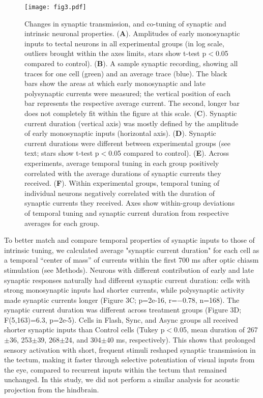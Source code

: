 \documentclass{article}
\begin{document}
\begin{figure*}[!t]
\texttt{[image: fig3.pdf]}
\caption{Changes in synaptic transmission, and co-tuning of synaptic and intrinsic neuronal properties. (\textbf{A}). Amplitudes of early monosynaptic inputs to tectal neurons in all experimental groups (in log scale, outliers brought within the axes limits, stars show t-test p$<$0.05 compared to control). (\textbf{B}). A sample synaptic recording, showing all traces for one cell (green) and an average trace (blue). The black bars show the areas at which early monosynaptic and late polysynaptic currents were measured; the vertical position of each bar represents the respective average current. The second, longer bar does not completely fit within the figure at this scale. (\textbf{C}). Synaptic current duration (vertical axis) was mostly defined by the amplitude of early monosynaptic inputs (horizontal axis). (\textbf{D}). Synaptic current durations were different between experimental groups (see text; stars show t-test p$<$0.05 compared to control). (\textbf{E}). Across experiments, average temporal tuning in each group positively correlated with the average durations of synaptic currents they received. (\textbf{F}). Within experimental groups, temporal tuning of individual neurons negatively correlated with the duration of synaptic currents they received. Axes show within-group deviations of temporal tuning and synaptic current duration from respective averages for each group.}
\end{figure*}

To better match and compare temporal properties of synaptic inputs to those of intrinsic tuning, we calculated average "synaptic current duration" for each cell as a temporal “center of mass” of currents within the first 700 ms after optic chiasm stimulation (see Methods). Neurons with different contribution of early and late synaptic responses naturally had different synaptic current duration: cells with strong monosynaptic inputs had shorter currents, while polysynaptic activity made synaptic currents longer (Figure 3C; p=2e-16, r=$-$0.78, n=168). The synaptic current duration was different across treatment groups (Figure 3D; F(5,163)=6.3, p=2e-5). Cells in Flash, Sync, and Async groups all received shorter synaptic inputs than Control cells (Tukey p$<$0.05, mean duration of 267$\pm$36, 253$\pm$39, 268$\pm$24, and 304$\pm$40 ms, respectively). This shows that prolonged sensory activation with short, frequent stimuli reshaped synaptic transmission in the tectum, making it faster through selective potentiation of visual inputs from the eye, compared to recurrent inputs within the tectum that remained unchanged. In this study, we did not perform a similar analysis for acoustic projection from the hindbrain.
\end{document}
